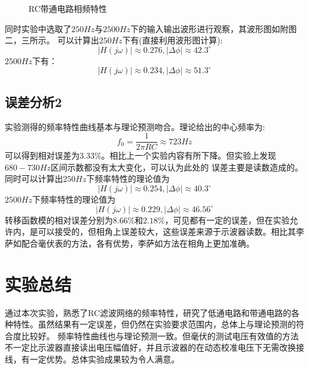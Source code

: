 \documentclass[a4paper,11pt,UTF8]{ctexart}
\begin{document}
  \begin{figure}[htbp]
    \centering
    \caption{RC带通电路相频特性}
    \label{fig:BPFPhi}
    \end{figure}
同时实验中选取了$250Hz$与$2500Hz$下的输入输出波形进行观察，其波形图如附图二，三所示。
可以计算出$250Hz$下有(直接利用波形图计算):
\begin{equation}
  |H(j\omega)|\approx0.276, |\Delta \phi|\approx42.3^\circ
\end{equation}
$2500Hz$下有：
\begin{equation}
  |H(j\omega)|\approx0.234, |\Delta \phi|\approx51.3^\circ
\end{equation}
\subsection{误差分析2}
实验测得的频率特性曲线基本与理论预测吻合。理论给出的中心频率为:
\begin{equation}
  f_0=\frac{1}{2\pi RC}\approx723Hz
\end{equation}
可以得到相对误差为$3.33\%$。相比上一个实验内容有所下降。但实验上发现$680-730Hz$区间示数都没有太大变化，可以认为此处的
误差主要是读数造成的。
同时可以计算出$250Hz$下频率特性的理论值为
\begin{equation}
  |H(j\omega)|\approx0.254, |\Delta \phi|\approx40.3^\circ
\end{equation}
$2500Hz$下频率特性的理论值为
\begin{equation}
  |H(j\omega)|\approx0.229, |\Delta \phi|\approx46.56^\circ
\end{equation}
转移函数模的相对误差分别为$8.66\%$和$2.18\%$，可见都有一定的误差，但在实验允许内，是可以接受的，但相角上误差较大，这些误差来源于示波器读数。相比其李萨如配合毫伏表的方法，各有优势，李萨如方法在相角上更加准确。
\section{实验总结}
通过本次实验，熟悉了RC滤波网络的频率特性，研究了低通电路和带通电路的各种特性。虽然结果有一定误差，但仍然在实验要求范围内，总体上与理论预测的符合度比较好。
频率特性曲线也与理论预测一致。但毫伏的测试电压有效值的方法不一定比示波器直接读出电压幅值好，并且示波器的在动态校准电压下无需改换接线，有一定优势。总体实验成果较为令人满意。
\end{document}
